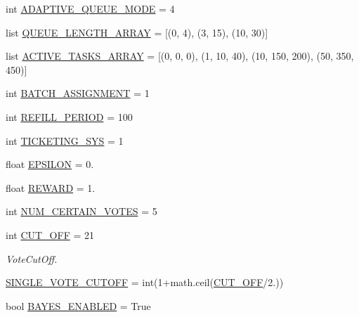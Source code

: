 \begin{DoxyCompactItemize}
\item 
int \mbox{\hyperlink{namespacedynamicfilterapp_1_1toggles_ae5f3a5957b65dd5d074c52ef01e0f732}{A\+D\+A\+P\+T\+I\+V\+E\+\_\+\+Q\+U\+E\+U\+E\+\_\+\+M\+O\+DE}} = 4
\item 
list \mbox{\hyperlink{namespacedynamicfilterapp_1_1toggles_af8d4fe75258dd9f8b4c8cdb1b5b68ad1}{Q\+U\+E\+U\+E\+\_\+\+L\+E\+N\+G\+T\+H\+\_\+\+A\+R\+R\+AY}} = \mbox{[}(0, 4), (3, 15), (10, 30)\mbox{]}
\item 
list \mbox{\hyperlink{namespacedynamicfilterapp_1_1toggles_a8f7b1e7beea29c74a7defab7d44ef294}{A\+C\+T\+I\+V\+E\+\_\+\+T\+A\+S\+K\+S\+\_\+\+A\+R\+R\+AY}} = \mbox{[}(0, 0, 0), (1, 10, 40), (10, 150, 200), (50, 350, 450)\mbox{]}
\item 
int \mbox{\hyperlink{namespacedynamicfilterapp_1_1toggles_ab1f6b66c3fc1afbd280b14695b54f33f}{B\+A\+T\+C\+H\+\_\+\+A\+S\+S\+I\+G\+N\+M\+E\+NT}} = 1
\item 
int \mbox{\hyperlink{namespacedynamicfilterapp_1_1toggles_a26c4f956b0a9438426925bee66b89a2b}{R\+E\+F\+I\+L\+L\+\_\+\+P\+E\+R\+I\+OD}} = 100
\item 
int \mbox{\hyperlink{namespacedynamicfilterapp_1_1toggles_a4efd3667e6643a4cd2b96c4e647fa2f7}{T\+I\+C\+K\+E\+T\+I\+N\+G\+\_\+\+S\+YS}} = 1
\item 
float \mbox{\hyperlink{namespacedynamicfilterapp_1_1toggles_a5f5369d7244632ac071379fbb460c8fe}{E\+P\+S\+I\+L\+ON}} = 0.
\item 
float \mbox{\hyperlink{namespacedynamicfilterapp_1_1toggles_a058a8495c920cb75e731931532524c19}{R\+E\+W\+A\+RD}} = 1.
\item 
int \mbox{\hyperlink{namespacedynamicfilterapp_1_1toggles_a157bc167f366f75c9ba8d3e36e8d8540}{N\+U\+M\+\_\+\+C\+E\+R\+T\+A\+I\+N\+\_\+\+V\+O\+T\+ES}} = 5
\item 
int \mbox{\hyperlink{namespacedynamicfilterapp_1_1toggles_a914791c176a78c026dc76a18bcd88d73}{C\+U\+T\+\_\+\+O\+FF}} = 21
\begin{DoxyCompactList}\small\item\em Vote\+Cut\+Off. \end{DoxyCompactList}\item 
\mbox{\hyperlink{namespacedynamicfilterapp_1_1toggles_afa8e106b735033b706b1412e12f6783b}{S\+I\+N\+G\+L\+E\+\_\+\+V\+O\+T\+E\+\_\+\+C\+U\+T\+O\+FF}} = int(1+math.\+ceil(\mbox{\hyperlink{namespacedynamicfilterapp_1_1toggles_a914791c176a78c026dc76a18bcd88d73}{C\+U\+T\+\_\+\+O\+FF}}/2.))
\item 
bool \mbox{\hyperlink{namespacedynamicfilterapp_1_1toggles_adadcb301c2f0066591eaf0a4c08ac96d}{B\+A\+Y\+E\+S\+\_\+\+E\+N\+A\+B\+L\+ED}} = True

\end{DoxyCompactItemize}
